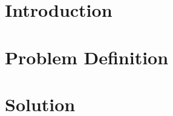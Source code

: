 \documentclass[a4paper,11pt,twoside,onecolumn,final,openright]{book}
\begin{document}


\pagestyle{headings}




\part{Introduction}
\thispagestyle{empty}




\part{Problem Definition}
\thispagestyle{empty}








\part{Solution}







\end{document}
